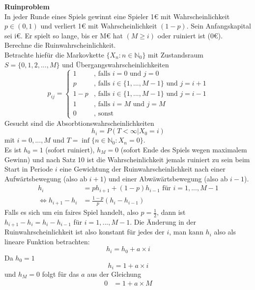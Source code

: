 \documentclass[a4paper,12pt]{article}
\begin{document}
\begin{tcolorbox}[breakable, colframe=blue, colback=white, title=Beispiel 9]
	\textbf{Ruinproblem}\\
	In jeder Runde eines Spiels gewinnt eine Spieler 1€ mit Wahrscheinlichkeit $p \in (0,1)$ und verliert 1€ mit Wahrscheinlichkeit $(1-p)$.
	Sein Anfangskapital sei i€. Er spielt so lange, bis er M€ hat $(M \geq i)$ oder ruiniert ist (0€).\\
	Berechne die Ruinwahrscheinlichkeit.\\
	Betrachte hiefür die Markovkette $\{X_n: n \in \mathbb{N}_0\}$ mit Zustandsraum $S = \{0, 1, 2, ..., M\}$ und Übergangswahrscheinlichkeiten
	$$
		p_{ij} = \begin{cases}
			1   & \text{, falls } i=0 \text{ und } j=0                       \\
			p   & \text{, falls } i \in \{1, ..., M-1\} \text{ und } j = i+1 \\
			1-p & \text{, falls } i \in \{1, ..., M-1\} \text{ und } j = i-1 \\
			1   & \text{, falls } i = M \text{ und } j = M                   \\
			0   & \text{, sonst}
		\end{cases}
	$$
	Gesucht sind die Absorbtionswahrscheinlichkeiten
	$$
		h_i = P(T<\infty|X_0 = i)
	$$
	mit $i = 0, ..., M$ und $T = \inf\{n \in \mathbb{N}_0: X_n = 0\}$.\\
	Es ist $h_0 = 1$ (sofort ruiniert), $h_M = 0$ (sofort Ende des Spiels wegen maximalem Gewinn) und nach Satz 10
	ist die Wahrscheinlichkeit jemals ruiniert zu sein beim Start in Periode $i$ eine Gewichtung der Ruinwahrscheinlichkeit
	nach einer Aufwärtsbewegung (also ab $i+1$) und einer Abwäwärtsbewegung (also ab $i-1$).
	\begin{align*}
		h_i                           & = ph_{i+1} + (1-p)h_{i-1} \text{ für } i = 1, ..., M-1 \\
		\Leftrightarrow h_{i+1} - h_i & = \frac{1-p}{p}(h_i - h_{i-1})
	\end{align*}
	Falls es sich um ein faires Spiel handelt, also $p =  \frac{1}{2}$, dann ist $h_{i+1} - h_i = h_i - h_{i-1}$ für $i=1, ..., M-1$.
	Die Änderung in der Ruinwahrscheinlichkeit ist also konstant für jedes der $i$, man kann $h_i$ also als lineare Funktion betrachten:
	$$
		h_i = h_0 + a \times i
	$$
	Da $h_0 = 1$
	$$
		h_i = 1 + a \times i
	$$
	und $h_M = 0$ folgt für das $a$ aus der Gleichung
	\begin{align*}
		0                 & = 1 + a \times M \\

\end{align*}
\end{tcolorbox}
\end{document}
